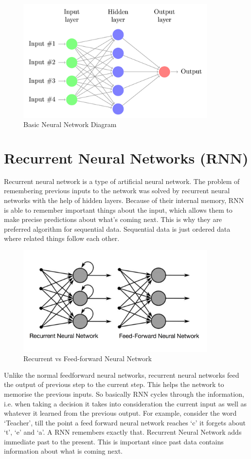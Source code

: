 \begin{figure}
	\caption{Basic Neural Network Diagram}
	\centering\includegraphics[width=10cm]{1.png}
\end{figure}

\section{Recurrent Neural Networks (RNN)}

Recurrent neural network is a type of artificial neural network. The problem of
remembering previous inputs to the network was solved by recurrent neural
networks with the help of hidden layers. Because of their internal memory, RNN
is able to remember important things about the input, which allows them to make
precise predictions about what’s coming next. This is why they are preferred
algorithm for sequential data. Sequential data is just ordered data where
related things follow each other.

\begin{figure}
	\caption{Recurrent vs Feed-forward Neural Network}
	\centering\includegraphics[width=10cm]{2.png}
\end{figure}

Unlike the normal feedforward neural networks, recurrent neural networks feed
the output of previous step to the current step. This helps the network to
memorise the previous inputs. So basically RNN cycles through the information,
i.e. when taking a decision it takes into consideration the current input as
well as whatever it learned from the previous output. For example, consider the
word ‘Teacher’, till the point a feed forward neural network reaches ‘c’ it
forgets about ‘t’, ‘e’ and ‘a’. A RNN remembers exactly that. Recurrent Neural
Network adds immediate past to the present. This is important since past data
contains information about what is coming next. 

